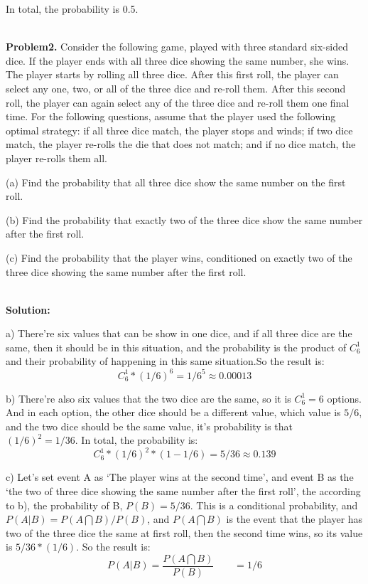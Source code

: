 \documentclass{article}
\begin{document}
In total, the probability is 0.5.


~\\


\noindent \textbf{Problem2.} Consider the following game, played with three standard six-sided dice. If the player ends
with all three dice showing the same number, she wins. The player starts by rolling all three dice. After
this first roll, the player can select any one, two, or all of the three dice and re-roll them. After this second
roll, the player can again select any of the three dice and re-roll them one final time. For the following
questions, assume that the player used the following optimal strategy: if all three dice match, the player
stops and winds; if two dice match, the player re-rolls the die that does not match; and if no dice match,
the player re-rolls them all.

(a) Find the probability that all three dice show the same number on the first roll.

(b) Find the probability that exactly two of the three dice show the same number after the first roll.

(c) Find the probability that the player wins, conditioned on exactly two of the three dice showing the
same number after the first roll.

~\\

\noindent \textbf{Solution:}

a) There're six values that can be show in one dice, and if all three dice are the same, then it should be in this situation, and the probability is the product of $C_6^1$ and their probability of happening in this same situation.So the result is:
$$ C_6^1 * (1/6)^6 = 1 / 6^5 \approx 0.00013$$

b) There're also six values that the two dice are the same, so it is $C_6^1 = 6$ options. And in each option, the other dice should be a different value, which value is $5/6$, and the two dice should be the same value, it's probability is that $(1/6)^2 = 1/36$. In total, the probability is:
$$ C_6^1 * (1/6)^2 * (1 - 1/6) = 5/36 \approx 0.139$$

c) Let's set event A as `The player wins at the second time', and event B as the `the two of three dice showing the same number after the first roll', the according to b), the probability of B, $P(B) = 5/36$. This is a conditional probability, and $P(A|B) = P(A \bigcap B) / P(B)$, and $P(A \bigcap B)$ is the event that the player has two of the three dice the same at first roll, then the second time wins, so its value is $5/36 * (1/6)$. So the result is:
$$P(A|B) = \frac{P(A \bigcap B)}{P(B)}\qquad = 1/6$$
\end{document}

